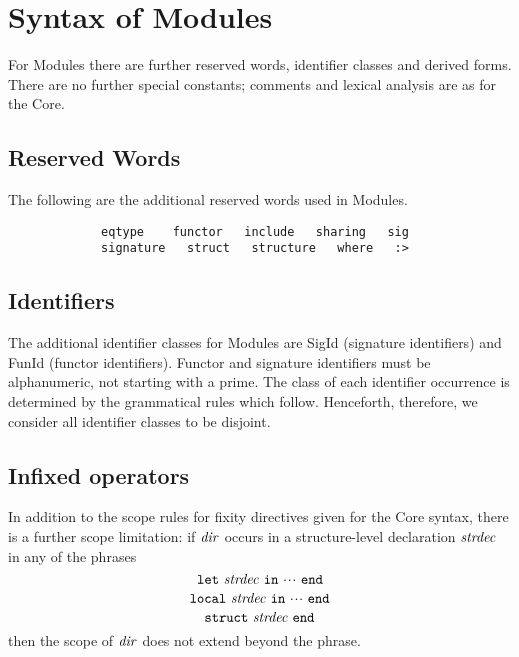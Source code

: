 %
\section{Syntax of Modules}
\label{syn-mod-sec}
For Modules there are further reserved words, identifier classes and derived
forms. There are no further special constants;
comments and lexical analysis are as for the Core.


\subsection{Reserved Words}
The following are the additional reserved words used in Modules.
\begin{verbatim}
             eqtype    functor   include   sharing   sig
             signature   struct   structure   where   :>
\end{verbatim}
\subsection{Identifiers}
\label{syn-mod-identifiers-sec}
The additional identifier classes for Modules are SigId (signature identifiers)
and FunId (functor identifiers). Functor and signature identifiers
must be alphanumeric, not starting with a prime.  The class of each identifier occurrence
is determined by the grammatical rules which follow.
Henceforth, therefore,
we consider all identifier classes to be disjoint.

\subsection{Infixed operators}
\label{infixopmod.sec}
In addition to the scope rules for fixity directives given for the Core syntax,
there is a further scope limitation:
if ${\it dir}$ occurs in a structure-level declaration ${\it strdec}$ in any of the
phrases
\[ \LET\ \strdec\ \IN\ \cdots\ \END \]
\[ \LOCAL\ \strdec\ \IN\ \cdots\ \END \]
\[ \STRUCT\ \strdec\ \END \]
then the scope of ${\it dir}$ does not extend beyond the phrase.

